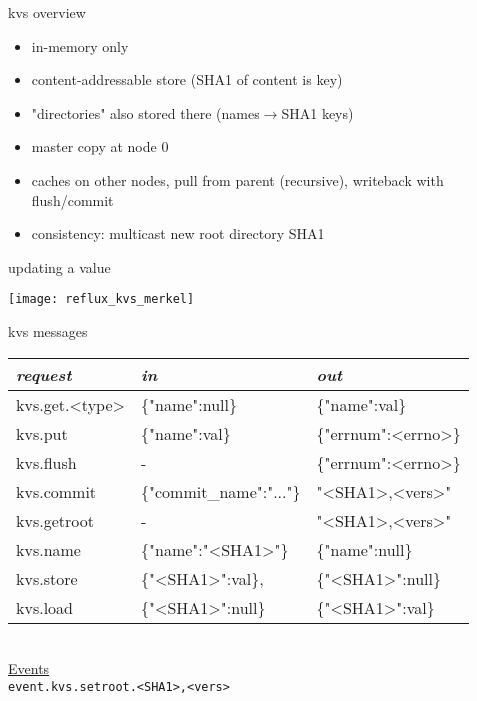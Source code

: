 \documentclass[default,pdf,colorBG,slideColor]{prosper}
\begin{document}
\begin{slide}{kvs overview}{\small
\begin{itemize}
  \item{in-memory only}
  \item{content-addressable store (SHA1 of content is key)}
  \item{"directories" also stored there (names$\rightarrow$SHA1 keys)}
  \item{master copy at node 0}
  \item{caches on other nodes, pull from parent (recursive),
        writeback with flush/commit}
  \item{consistency: multicast new root directory SHA1}
\end{itemize}
}\end{slide}

\begin{slide}{updating a value}{\small
\begin{center}
  \texttt{[image: reflux\_kvs\_merkel]}
\end{center}
}\end{slide}

\begin{slide}{kvs messages}{\tiny
\begin{tabular}{|l|l|l|}
\hline
{\em request } & {\em in } & {\em out }\\
\hline
kvs.get.<type> & \{"name":null\}
               & \{"name":val\}\\
kvs.put        & \{"name":val\}
               & \{"errnum":<errno>\}\\
kvs.flush      & -
               & \{"errnum":<errno>\}\\
kvs.commit     & \{"commit\_name":"..."\}
               & "<SHA1>,<vers>"\\
\hline
kvs.getroot    & -
               & "<SHA1>,<vers>"\\
kvs.name       & \{"name":"<SHA1>"\}
               & \{"name":null\}\\
kvs.store      & \{"<SHA1>":val\},
               & \{"<SHA1>":null\}\\
kvs.load       & \{"<SHA1>":null\}
               & \{"<SHA1>":val\}\\
\hline
\end{tabular}\\
\underline{Events}\\
{\tt event.kvs.setroot.<SHA1>,<vers>}\\
}\end{slide}
\end{document}
